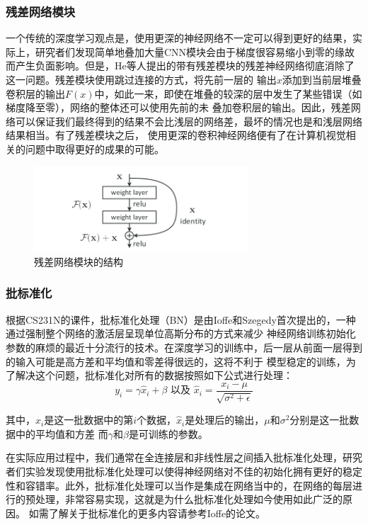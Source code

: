 \documentclass[supercite]{HustGraduPaper}
\theoremstyle{definition}
\begin{document}
\subsubsection{残差网络模块}

一个传统的深度学习观点是，使用更深的神经网络不一定可以得到更好的结果，实际上，研究者们发现简单地叠加大量CNN模块会由于梯度很容易缩小到零的缘故
而产生负面影响。但是，He等人\cite{he2015deep}提出的带有残差模块的残差神经网络彻底消除了这一问题。残差模块使用跳过连接的方式，将先前一层的
输出$x$添加到当前层堆叠卷积层的输出$F(x)$中，如此一来，即使在堆叠的较深的层中发生了某些错误（如梯度降至零），网络的整体还可以使用先前的未
叠加卷积层的输出。因此，残差网络可以保证我们最终得到的结果不会比浅层的网络差，最坏的情况也是和浅层网络结果相当。有了残差模块之后，
使用更深的卷积神经网络便有了在计算机视觉相关的问题中取得更好的成果的可能。
\begin{figure}[H]
  \begin{center}
  \includegraphics[width=8cm]{images/resnet}
  \end{center}
  \caption{残差网络模块的结构}
  \label{fig:Res-structure}
\end{figure}

\subsubsection{批标准化}
\label{sec:BN}
根据CS231N\cite{cs231n}的课件，批标准化处理（BN）是由Ioffe和Szegedy首次提出的，一种通过强制整个网络的激活层呈现单位高斯分布的方式来减少
神经网络训练初始化参数的麻烦的最近十分流行的技术。在深度学习的训练中，后一层从前面一层得到的输入可能是高方差和平均值和零差得很远的，这将不利于
模型稳定的训练，为了解决这个问题，批标准化对所有的数据按照如下公式进行处理：
$$y_{i}=\gamma \hat{x}_{i}+\beta \text { 以及 } \hat{x}_{i}=\frac{x_{i}-\mu}{\sqrt{\sigma^{2}+\epsilon}}$$

其中，$x_{i}$是这一批数据中的第$i$个数据，$\hat{x}_{i}$是处理后的输出，$\mu$和$\sigma^{2}$分别是这一批数据中的平均值和方差 
而$\gamma$和$\beta$是可训练的参数。

在实际应用过程中，我们通常在全连接层和非线性层之间插入批标准化处理，研究者们实验发现使用批标准化处理可以使得神经网络对不佳的初始化拥有更好的稳定
性和容错率。此外，批标准化处理可以当作是集成在网络当中的，在网络的每层进行的预处理，非常容易实现，这就是为什么批标准化处理如今使用如此广泛的原因。
如需了解关于批标准化的更多内容请参考Ioffe的论文\cite{ioffe2015batch}。
\end{document}
